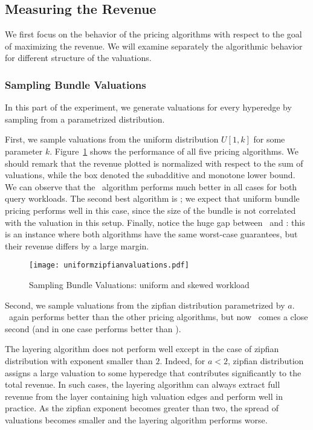 \subsection{Measuring the Revenue }

We first focus on the behavior of the pricing algorithms with respect to the goal of 
maximizing the revenue. We will examine separately the algorithmic behavior for
different structure of the valuations.


\subsubsection{Sampling Bundle Valuations} 
In this part of the experiment, we generate valuations for every hyperedge by sampling 
from a parametrized distribution.

First, we sample valuations from the uniform distribution $U[1,k]$ for some parameter $k$.
Figure~\ref{fig:unifzipfian} shows the performance of all five pricing algorithms. We should
remark that the revenue plotted is normalized with respect to the sum of valuations, while
the box denoted the subadditive and monotone lower bound. 
We can observe that the \lpip\ algorithm performs much better in all cases for both query
workloads. The second best algorithm is \ubp; we expect that uniform bundle pricing performs
well in this case, since the size of the bundle is not correlated with the valuation in this setup.
Finally, notice the huge gap between \uip\ and \lpip: this is an instance where both algorithms have
the same worst-case guarantees, but their revenue differs by a large margin. 


\begin{figure}[!t]
	\centering
	\texttt{[image: uniformzipfianvaluations.pdf]}
	\caption{Sampling Bundle Valuations: uniform and skewed workload} \label{fig:unifzipfian}
\end{figure}  

Second, we sample valuations from the zipfian distribution parametrized by $a$.
\lpip\ again performs better than the other pricing algorithms, but now \ubp\ comes a close second
(and in one case performs better than \lpip).  

The layering algorithm does not perform well except in the case of zipfian distribution with exponent smaller than $2$. Indeed, for $a < 2$, zipfian distribution assigns a large valuation to some hyperedge that contributes significantly to the total revenue. In such cases, the layering algorithm can always extract full revenue from the layer containing high valuation edges and perform well in practice. As the zipfian exponent becomes greater than two, the spread of valuations becomes smaller and the layering algorithm performs worse. 

